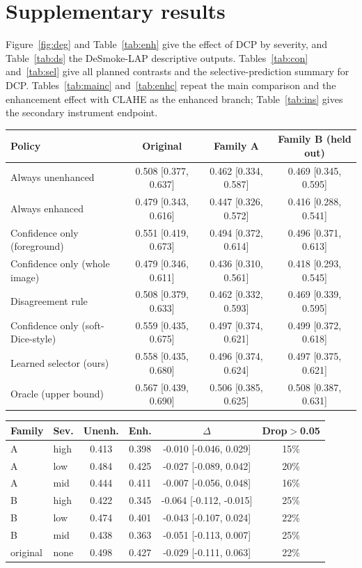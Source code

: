 \documentclass{midl}
\begin{document}
\section{Supplementary results}
\label{app:supp}
Figure~\ref{fig:deg} and Table~\ref{tab:enh} give the effect of DCP by severity, and Table~\ref{tab:ds} the DeSmoke-LAP descriptive outputs. Tables~\ref{tab:con} and~\ref{tab:sel} give all planned contrasts and the selective-prediction summary for DCP. Tables~\ref{tab:mainc} and~\ref{tab:enhc} repeat the main comparison and the enhancement effect with CLAHE as the enhanced branch; Table~\ref{tab:ins} gives the secondary instrument endpoint.
\begin{table}[htbp]
{\scriptsize\begin{tabular}{lccc}\toprule Policy & Original & Family A & Family B (held out)\\\midrule
Always unenhanced & 0.508 [0.377, 0.637] & 0.462 [0.334, 0.587] & 0.469 [0.345, 0.595] \\
Always enhanced & 0.479 [0.343, 0.616] & 0.447 [0.326, 0.572] & 0.416 [0.288, 0.541] \\
Confidence only (foreground) & 0.551 [0.419, 0.673] & 0.494 [0.372, 0.614] & 0.496 [0.371, 0.613] \\
Confidence only (whole image) & 0.479 [0.346, 0.611] & 0.436 [0.310, 0.561] & 0.418 [0.293, 0.545] \\
Disagreement rule & 0.508 [0.379, 0.633] & 0.462 [0.332, 0.593] & 0.469 [0.339, 0.595] \\
Confidence only (soft-Dice-style) & 0.559 [0.435, 0.675] & 0.497 [0.374, 0.621] & 0.499 [0.372, 0.618] \\
Learned selector (ours) & 0.558 [0.435, 0.680] & 0.496 [0.374, 0.624] & 0.497 [0.375, 0.621] \\
Oracle (upper bound) & 0.567 [0.439, 0.690] & 0.506 [0.385, 0.625] & 0.508 [0.387, 0.631] \\
\bottomrule\end{tabular}}
\end{table}
\begin{table}[htbp]
{\scriptsize\begin{tabular}{llcccc}\toprule Family & Sev. & Unenh. & Enh. & $\Delta$ & Drop$>$0.05\\\midrule
A & high & 0.413 & 0.398 & -0.010 [-0.046, 0.029] & 15\% \\
A & low & 0.484 & 0.425 & -0.027 [-0.089, 0.042] & 20\% \\
A & mid & 0.444 & 0.411 & -0.007 [-0.056, 0.048] & 16\% \\
B & high & 0.422 & 0.345 & -0.064 [-0.112, -0.015] & 25\% \\
B & low & 0.474 & 0.401 & -0.043 [-0.107, 0.024] & 22\% \\
B & mid & 0.438 & 0.363 & -0.051 [-0.113, 0.007] & 25\% \\
original & none & 0.498 & 0.427 & -0.029 [-0.111, 0.063] & 22\% \\
\bottomrule\end{tabular}}
\end{table}
\end{document}
